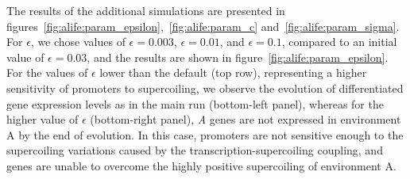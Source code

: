 The results of the additional simulations are presented in figures~\ref{fig:alife:param_epsilon},~\ref{fig:alife:param_c} and~\ref{fig:alife:param_sigma}.
For $\epsilon$, we chose values of $\epsilon = 0.003$, $\epsilon = 0.01$, and $\epsilon = 0.1$, compared to an initial value of $\epsilon = 0.03$, and the results are shown in figure~\ref{fig:alife:param_epsilon}.
For the values of $\epsilon$ lower than the default (top row), representing a higher sensitivity of promoters to supercoiling, we observe the evolution of differentiated gene expression levels as in the main run (bottom-left panel), whereas for the higher value of $\epsilon$ (bottom-right panel), \emph{A} genes are not expressed in environment A by the end of evolution.
In this case, promoters are not sensitive enough to the supercoiling variations caused by the transcription-supercoiling coupling, and genes are unable to overcome the highly positive supercoiling of environment A.

